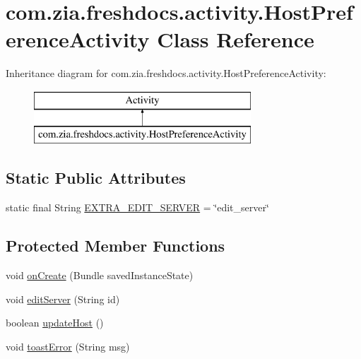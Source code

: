 \hypertarget{classcom_1_1zia_1_1freshdocs_1_1activity_1_1_host_preference_activity}{\section{com.\-zia.\-freshdocs.\-activity.\-Host\-Preference\-Activity Class Reference}
\label{classcom_1_1zia_1_1freshdocs_1_1activity_1_1_host_preference_activity}
}
Inheritance diagram for com.\-zia.\-freshdocs.\-activity.\-Host\-Preference\-Activity\-:\begin{figure}[H]
\begin{center}
\leavevmode
\includegraphics[height=2.000000cm]{classcom_1_1zia_1_1freshdocs_1_1activity_1_1_host_preference_activity}
\end{center}
\end{figure}
\subsection*{Static Public Attributes}
\begin{DoxyCompactItemize}
\item 
static final String \hyperlink{classcom_1_1zia_1_1freshdocs_1_1activity_1_1_host_preference_activity_ac1fff866f45e7541484f8f17a62cdad1}{E\-X\-T\-R\-A\-\_\-\-E\-D\-I\-T\-\_\-\-S\-E\-R\-V\-E\-R} = \char`\"{}edit\-\_\-server\char`\"{}
\end{DoxyCompactItemize}
\subsection*{Protected Member Functions}
\begin{DoxyCompactItemize}
\item 
void \hyperlink{classcom_1_1zia_1_1freshdocs_1_1activity_1_1_host_preference_activity_a99b270737bc02ff940a5812caa7882cb}{on\-Create} (Bundle saved\-Instance\-State)
\item 
void \hyperlink{classcom_1_1zia_1_1freshdocs_1_1activity_1_1_host_preference_activity_a6413cff519b11d77f1f597f8866bade0}{edit\-Server} (String id)
\item 
boolean \hyperlink{classcom_1_1zia_1_1freshdocs_1_1activity_1_1_host_preference_activity_a7953d2c75d92e1f1016af1ac1a381fb6}{update\-Host} ()
\item 
void \hyperlink{classcom_1_1zia_1_1freshdocs_1_1activity_1_1_host_preference_activity_a559089976e4073e8504fa9d2c4e4cdf9}{toast\-Error} (String msg)
\end{DoxyCompactItemize}

